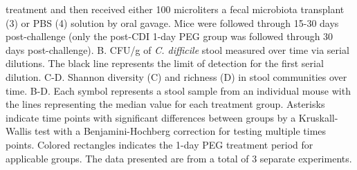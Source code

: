 \documentclass[
  11pt,
]{article}
\begin{document}
treatment and then received either 100 microliters a fecal microbiota
transplant (3) or PBS (4) solution by oral gavage. Mice were followed
through 15-30 days post-challenge (only the post-CDI 1-day PEG group was
followed through 30 days post-challenge). B. CFU/g of \emph{C.
difficile} stool measured over time via serial dilutions. The black line
represents the limit of detection for the first serial dilution. C-D.
Shannon diversity (C) and richness (D) in stool communities over time.
B-D. Each symbol represents a stool sample from an individual mouse with
the lines representing the median value for each treatment group.
Asterisks indicate time points with significant differences between
groups by a Kruskall-Wallis test with a Benjamini-Hochberg correction
for testing multiple times points. Colored rectangles indicates the
1-day PEG treatment period for applicable groups. The data presented are
from a total of 3 separate experiments. \newpage
\end{document}
